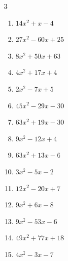 \begin{multicols}{3}
\begin{enumerate}
  \item $14x^{2}+x-4$

        \phantom{$=(2x-1)(7x+4)$}

  \item $27x^{2}-60x+25$

        \phantom{$=(3x-5)(9x-5)$}

  \item $8x^{2}+50x+63$

        \phantom{$=(4x+7)(2x+9)$}

  \item $4x^{2}+17x+4$

        \phantom{$=(x+4)(4x+1)$}

  \item $2x^{2}-7x+5$

        \phantom{$=(2x-5)(x-1)$}

  \item $45x^{2}-29x-30$

        \phantom{$=(9x+5)(5x-6)$}

\columnbreak %

  \item $63x^{2}+19x-30$

        \phantom{$=(7x+6)(9x-5)$}

  \item $9x^{2}-12x+4$


  \item $63x^{2}+13x-6$

        \phantom{$=(9x-2)(7x+3)$}

  \item $3x^{2}-5x-2$

        \phantom{$=(3x+1)(x-2)$}

  \item $12x^{2}-20x+7$

        \phantom{$=(6x-7)(2x-1)$}

  \item $9x^{2}+6x-8$

        \phantom{$=(3x+4)(3x-2)$}

  \item $9x^{2}-53x-6$

        \phantom{$=(x-6)(9x+1)$}

  \item $49x^{2}+77x+18$

        \phantom{$=(7x+9)(7x+2)$}

  \item $4x^{2}-3x-7$


\end{enumerate}
\end{multicols}
